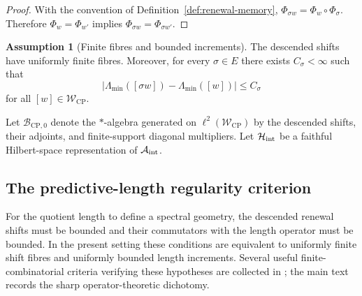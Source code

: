 \documentclass[11pt]{article}
\theoremstyle{definition}
\newtheorem{assumption}{Assumption}[section]
\theoremstyle{remark}
\newcommand{\A}{\mathcal{A}}
\newcommand{\B}{\mathcal{B}}
\newcommand{\Hh}{\mathcal{H}}
\newcommand{\W}{\mathcal{W}}
\newcommand{\CP}{\mathrm{CP}}
\newcommand{\Lam}{\Lambda}
\begin{document}
\begin{proof}
With the convention of Definition~\ref{def:renewal-memory}, $\Phi_{\sigma w}=\Phi_w\circ\Phi_\sigma$.  Therefore $\Phi_w=\Phi_{w'}$ implies $\Phi_{\sigma w}=\Phi_{\sigma w'}$.
\end{proof}

\begin{assumption}[Finite fibres and bounded increments]
\label{ass:fibres}
The descended shifts have uniformly finite fibres.  Moreover, for every $\sigma\in E$ there exists $C_\sigma<\infty$ such that
\[
 |\Lam_{\min}([\sigma w])-\Lam_{\min}([w])|\le C_\sigma
\]
for all $[w]\in\W_{\CP}$.
\end{assumption}

Let $\B_{\CP,0}$ denote the $*$-algebra generated on $\ell^2(\W_{\CP})$ by the descended shifts, their adjoints, and finite-support diagonal multipliers.  Let $\Hh_{\rm int}$ be a faithful Hilbert-space representation of $\A_{\rm int}$.



\subsection{The predictive-length regularity criterion}
\label{subsec:predictive-length-criterion}

For the quotient length to define a spectral geometry, the descended renewal
shifts must be bounded and their commutators with the length operator must be
bounded.  In the present setting these conditions are equivalent to uniformly
finite shift fibres and uniformly bounded length increments.  Several useful
finite-combinatorial criteria verifying these hypotheses are collected in
; the main text records the sharp operator-theoretic
dichotomy.
\end{document}
